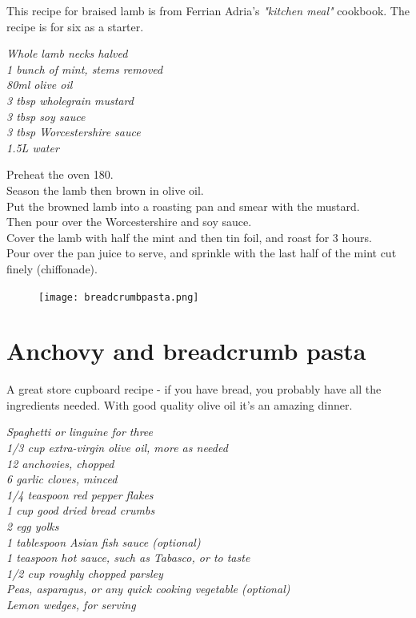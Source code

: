 \documentclass{tufte-book}
\begin{document}
This recipe for braised lamb is from Ferrian Adria's \emph{"kitchen meal"} cookbook. The recipe is for six as a starter. 

\smallskip
\emph{Whole lamb necks halved
\\1 bunch of mint, stems removed
\\80ml olive oil
\\3 tbsp wholegrain mustard
\\3 tbsp soy sauce
\\3 tbsp Worcestershire sauce
\\ 1.5L water
}

\smallskip
Preheat the oven 180\celsius.
\\Season the lamb then brown in olive oil.
\\Put the browned lamb into a roasting pan and smear with the mustard.
\\Then pour over the Worcestershire and soy sauce.
\\Cover the lamb with half the mint and then tin foil, and roast for 3 hours.
\\Pour over the pan juice to serve, and sprinkle with the last half of the mint cut finely (chiffonade).




\begin{figure}[h]
  \texttt{[image: breadcrumbpasta.png]}
\end{figure}

\section{Anchovy and breadcrumb pasta }

A great store cupboard recipe - if you have bread, you probably have all the ingredients needed. With good quality olive oil it's an amazing dinner.

\smallskip
\emph{Spaghetti or linguine for three
\\1/3 cup extra-virgin olive oil, more as needed
\\12 anchovies, chopped
\\6 garlic cloves, minced
\\1/4 teaspoon red pepper flakes
\\1 cup good dried bread crumbs
\\2 egg yolks
\\1 tablespoon Asian fish sauce (optional)
\\1 teaspoon hot sauce, such as Tabasco, or to taste
\\1/2 cup roughly chopped parsley
\\ Peas, asparagus, or any quick cooking vegetable (optional)
\\Lemon wedges, for serving}
\end{document}

